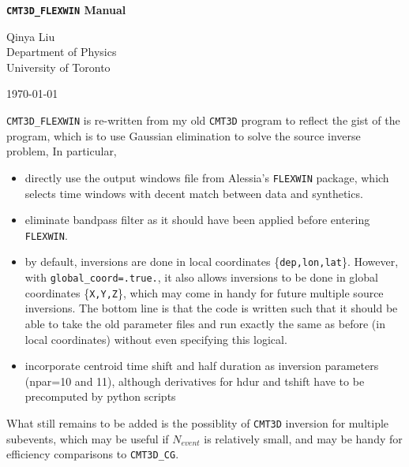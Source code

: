 \documentclass[12pt,titlepage,fleqn]{article}
\begin{document}
\begin{spacing}{1.0} %
\begin{center}

\Large {\vspace{0.1in} \bf \verb+CMT3D_FLEXWIN+ Manual}

\small
Qinya Liu \\
Department of Physics \\
University of Toronto

\today

\end{center}

\end{spacing}

\verb=CMT3D_FLEXWIN= is re-written from my old \verb=CMT3D= program to reflect the gist of the program, which is to use Gaussian elimination to solve the source inverse problem, In particular,
\begin{itemize}
\item directly use the output windows file from Alessia's \verb=FLEXWIN= package, which selects time windows with decent match between data and synthetics.
\item eliminate bandpass filter as it should have been applied before entering \verb+FLEXWIN+.
\item  by default, inversions are done in local coordinates \{\verb+dep,lon,lat+\}. However, with \verb+global_coord=.true.+, it also allows inversions to be done in global coordinates \{\verb+X,Y,Z+\}, which may come in handy for future multiple source inversions. The  bottom line is that the code is written such that it should be able to take the old parameter files and run exactly the same as before (in local coordinates) without even specifying this logical.
\item incorporate centroid time shift and half duration as inversion parameters (npar=10 and 11), although derivatives for hdur and tshift have to be precomputed by python scripts 
\end{itemize}
What still remains to be added is the possiblity of \verb+CMT3D+ inversion for multiple subevents, which may be useful if $N_{event}$ is relatively small, and may be handy for efficiency comparisons to \verb+CMT3D_CG+.


\end{document}
